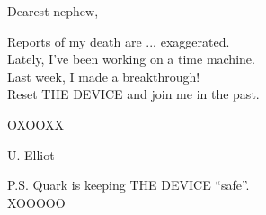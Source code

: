 \documentclass[parskip=half]{scrarticle}
\begin{document}
Dearest nephew,

\smallskip

R\hspace{0.15em}eports of my death are ... exaggerated.\\
L\hspace{0.15em}ately, I've been working on a time machine.\\
L\hspace{0.15em}ast week, I made a breakthrough!\\
R\hspace{0.15em}eset THE DEVICE and join me in the past.

\smallskip

OXOOXX

{
\setmainfont{Bilbo Swash Caps}
\huge
U. Elliot
}

\smallskip

\smallskip

P.S. Quark is keeping THE DEVICE ``safe''.\\
XOOOOO
\end{document}
